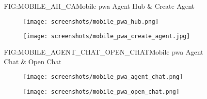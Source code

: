 \begin{figure}[Mobile Agent Hub \& Create Agent]{FIG:MOBILE_AH_CA}{Mobile \ac{pwa} Agent Hub \& Create Agent}
    \begin{subfigure}[FIG:MOBILE_AGENT_HUB]{Agent Hub}{\texttt{[image: screenshots/mobile\_pwa\_hub.png]}}
    \end{subfigure}
    \hspace{2em}
    \begin{subfigure}[FIG:MOBILE_CREATE_AGENT]{Create Agent}{\texttt{[image: screenshots/mobile\_pwa\_create\_agent.jpg]}}
    \end{subfigure}
\end{figure}

\begin{figure}[Mobile Agent Chat \& Open Chat]{FIG:MOBILE_AGENT_CHAT_OPEN_CHAT}{Mobile \ac{pwa} Agent Chat \& Open Chat}
    \begin{subfigure}[FIG:MOBILE_AGENT_CHAT]{Agent Chat}{\texttt{[image: screenshots/mobile\_pwa\_agent\_chat.png]}}
    \end{subfigure}
    \hspace{2em}
    \begin{subfigure}[FIG:MOBILE_OPEN_CHAT]{Open Chat}{\texttt{[image: screenshots/mobile\_pwa\_open\_chat.png]}}
    \end{subfigure}
\end{figure}
